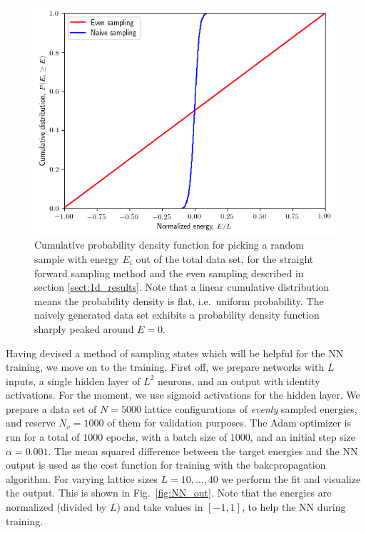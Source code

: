 \documentclass[a4paper, twocolumn]{article}
\newcommand{\fig}[1]{Fig.\ \ref{fig:#1}}
\begin{document}
\begin{figure}
  \centering
  \includegraphics[width=\textwidth]{visualize_sampling.png}
  \caption{Cumulative probability density function for picking a random sample with energy $E_i$ out of the total data set, for the straight forward sampling method and the even sampling described in section \ref{sect:1d_results}. Note that a linear cumulative distribution means the probability density is flat, i.e.\ uniform probability. The naively generated data set exhibits a probability density function sharply peaked around $E=0$. \label{fig:cdf}}
\end{figure}

Having devised a method of sampling states which will be helpful for the NN training, we move on to the training. First off, we prepare networks with $L$ inputs, a single hidden layer of $L^2$ neurons, and an output with identity activations. For the moment, we use sigmoid activations for the hidden layer. We prepare a data set of $N=5000$ lattice configurations of \textit{evenly} sampled energies, and reserve $N_v=1000$ of them for validation purposes. The Adam optimizer is run for a total of $1000$ epochs, with a batch size of $1000$, and an initial step size $\alpha=0.001$. The mean squared difference between the target energies and the NN output is used as the cost function for training with the bakcpropagation algorithm. For varying lattice sizes $L=10,\dots,40$ we perform the fit and visualize the output. This is shown in \fig{NN_out}. Note that the energies are normalized (divided by $L$) and take values in $[-1,1]$, to help the NN during training. 
\end{document}
